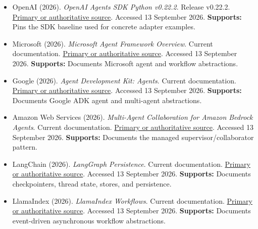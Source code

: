 \begin{itemize}
\item {}\textbf{} OpenAI (2026). \emph{OpenAI Agents SDK Python v0.22.2}. Release v0.22.2. \href{\detokenize{https://github.com/openai/openai-agents-python/releases/tag/v0.22.2}}{Primary or authoritative source}. Accessed 13 September 2026. \textbf{Supports:} Pins the SDK baseline used for concrete adapter examples.

\item {}\textbf{} Microsoft (2026). \emph{Microsoft Agent Framework Overview}. Current documentation. \href{\detokenize{https://learn.microsoft.com/en-us/agent-framework/overview}}{Primary or authoritative source}. Accessed 13 September 2026. \textbf{Supports:} Documents Microsoft agent and workflow abstractions.

\item {}\textbf{} Google (2026). \emph{Agent Development Kit: Agents}. Current documentation. \href{\detokenize{https://adk.dev/agents}}{Primary or authoritative source}. Accessed 13 September 2026. \textbf{Supports:} Documents Google ADK agent and multi-agent abstractions.

\item {}\textbf{} Amazon Web Services (2026). \emph{Multi-Agent Collaboration for Amazon Bedrock Agents}. Current documentation. \href{\detokenize{https://docs.aws.amazon.com/bedrock/latest/userguide/agents-multi-agent-collaboration.html}}{Primary or authoritative source}. Accessed 13 September 2026. \textbf{Supports:} Documents the managed supervisor/collaborator pattern.

\item {}\textbf{} LangChain (2026). \emph{LangGraph Persistence}. Current documentation. \href{\detokenize{https://docs.langchain.com/oss/python/langgraph/persistence}}{Primary or authoritative source}. Accessed 13 September 2026. \textbf{Supports:} Documents checkpointers, thread state, stores, and persistence.

\item {}\textbf{} LlamaIndex (2026). \emph{LlamaIndex Workflows}. Current documentation. \href{\detokenize{https://docs.llamaindex.ai/en/stable/module_guides/workflow/}}{Primary or authoritative source}. Accessed 13 September 2026. \textbf{Supports:} Documents event-driven asynchronous workflow abstractions.


\end{itemize}
